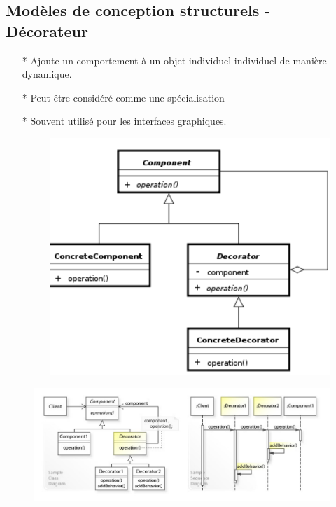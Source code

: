 \documentclass[12pt]{article}
\begin{document}
\subsection{Modèles de conception structurels - Décorateur}
\begin{itemize}
	\item[* ] Ajoute un comportement à un objet individuel
	individuel de manière dynamique.
	\item[* ] Peut être considéré comme une
	spécialisation
	\item[* ] Souvent utilisé pour les interfaces graphiques.
	\newpage
	\begin{figure}[!hbtp]
		\centering
		\includegraphics[scale=0.75]{Capture2.PNG}
	\end{figure}

\end{itemize}
\begin{figure}[!hbtp]
	\centering
	\includegraphics[scale=0.75]{Capture3.PNG}
\end{figure}
\end{document}
